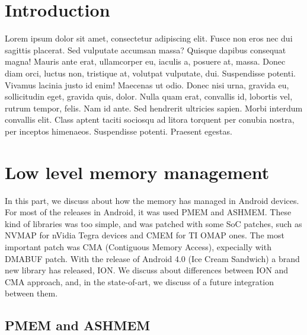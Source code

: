 \documentclass[a4paper,10pt]{article}
\begin{document}
\vspace{4ex}	%
\begin{multicols}{2}

\section{Introduction}

Lorem ipsum dolor sit amet, consectetur adipiscing elit.  Fusce non eros nec dui
sagittis placerat. Sed vulputate accumsan massa? Quisque dapibus consequat
magna! Mauris ante erat, ullamcorper eu, iaculis a, posuere at, massa. Donec
diam orci, luctus non, tristique at, volutpat vulputate, dui.  Suspendisse
potenti. Vivamus lacinia justo id enim! Maecenas ut odio. Donec nisi urna,
gravida eu, sollicitudin eget, gravida quis, dolor. Nulla quam erat, convallis
id, lobortis vel, rutrum tempor, felis. Nam id ante. Sed hendrerit ultricies
sapien. Morbi interdum convallis elit. Class aptent taciti sociosqu ad litora
torquent per conubia nostra, per inceptos himenaeos. Suspendisse potenti.
Praesent egestas.


\section{Low level memory management}
In this part, we discuss about how the memory has managed in Android devices. For
most of the releases in Android, it was used PMEM and ASHMEM. These kind of libraries
was too simple, and was patched with some SoC patches, such as NVMAP for nVidia Tegra devices
and CMEM for TI OMAP ones. The most important patch was CMA (Contiguous Memory Access), expecially
with DMABUF patch. With the release of Android 4.0 (Ice Cream Sandwich) a brand new library has released,
ION. We discuss about differences between ION and CMA approach, and, in the state-of-art, 
we discuss of a future integration between them.

\subsection{PMEM and ASHMEM}


\end{multicols}
\end{document}
